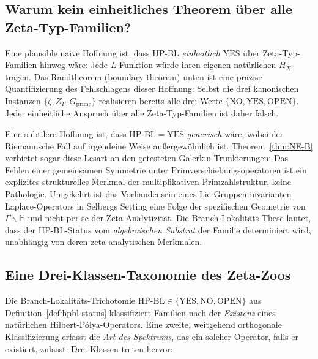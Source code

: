 \documentclass[11pt]{article}
\theoremstyle{definition}
\theoremstyle{remark}
\newcommand{\HBL}{\mathrm{HP\text{-}BL}}
\begin{document}
\subsection{Warum kein einheitliches Theorem über alle Zeta-Typ-Familien?}

Eine plausible naive Hoffnung ist, dass $\HBL$ \emph{einheitlich}
$\mathrm{YES}$ über Zeta-Typ-Familien hinweg wäre: Jede $L$-Funktion würde ihren eigenen
natürlichen $H_X$ tragen. Das Randtheorem (boundary theorem) unten ist eine präzise
Quantifizierung des Fehlschlagens dieser Hoffnung: Selbst die drei kanonischen
Instanzen $\{\zeta, Z_\Gamma, G_\mathrm{prime}\}$ realisieren bereits alle drei
Werte $\{\mathrm{NO}, \mathrm{YES}, \mathrm{OPEN}\}$. Jeder einheitliche
Anspruch über alle Zeta-Typ-Familien ist daher falsch.

Eine subtilere Hoffnung ist, dass $\HBL = \mathrm{YES}$ \emph{generisch} wäre,
wobei der Riemannsche Fall auf irgendeine Weise außergewöhnlich ist. Theorem~\ref{thm:NE-B}
verbietet sogar diese Lesart an den getesteten Galerkin-Trunkierungen: Das
Fehlen einer gemeinsamen Symmetrie unter Primverschiebungsoperatoren ist ein explizites
strukturelles Merkmal der multiplikativen Primzahlstruktur, keine Pathologie. Umgekehrt
ist das Vorhandensein eines Lie-Gruppen-invarianten Laplace-Operators in Selbergs
Setting eine Folge der spezifischen Geometrie von $\Gamma\backslash\mathbb{H}$ und
nicht per se der Zeta-Analytizität. Die Branch-Lokalitäts-These lautet, dass
der $\HBL$-Status vom \emph{algebraischen Substrat} der Familie determiniert wird,
unabhängig von deren zeta-analytischen Merkmalen.

\subsection{Eine Drei-Klassen-Taxonomie des Zeta-Zoos}
\label{sec:three-class-taxonomy}

Die Branch-Lokalitäts-Trichotomie $\HBL \in \{\mathrm{YES}, \mathrm{NO}, \mathrm{OPEN}\}$
aus Definition~\ref{def:hpbl-status} klassifiziert Familien nach der
\emph{Existenz} eines natürlichen Hilbert-P\'olya-Operators. Eine zweite,
weitgehend orthogonale Klassifizierung erfasst die \emph{Art des Spektrums}, das
ein solcher Operator, falls er existiert, zulässt. Drei Klassen treten hervor:
\end{document}
